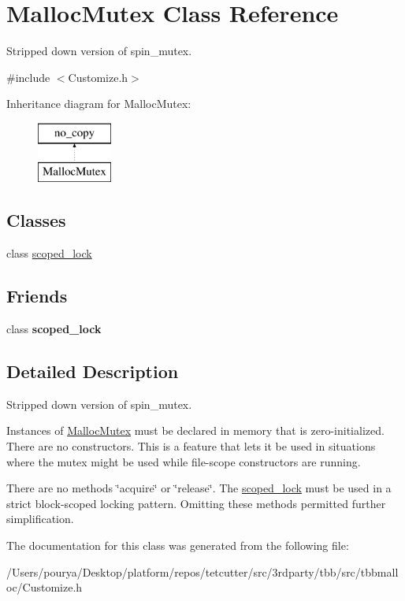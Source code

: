 \hypertarget{classMallocMutex}{}\section{Malloc\+Mutex Class Reference}
\label{classMallocMutex}


Stripped down version of spin\+\_\+mutex.  




{\ttfamily \#include $<$Customize.\+h$>$}

Inheritance diagram for Malloc\+Mutex\+:\begin{figure}[H]
\begin{center}
\leavevmode
\includegraphics[height=2.000000cm]{classMallocMutex}
\end{center}
\end{figure}
\subsection*{Classes}
\begin{DoxyCompactItemize}
\item 
class \hyperlink{classMallocMutex_1_1scoped__lock}{scoped\+\_\+lock}
\end{DoxyCompactItemize}
\subsection*{Friends}
\begin{DoxyCompactItemize}
\item 
\hypertarget{classMallocMutex_afcf922650b2fd9d76b7b939d8511bbd8}{}class {\bfseries scoped\+\_\+lock}\label{classMallocMutex_afcf922650b2fd9d76b7b939d8511bbd8}

\end{DoxyCompactItemize}


\subsection{Detailed Description}
Stripped down version of spin\+\_\+mutex. 

Instances of \hyperlink{classMallocMutex}{Malloc\+Mutex} must be declared in memory that is zero-\/initialized. There are no constructors. This is a feature that lets it be used in situations where the mutex might be used while file-\/scope constructors are running.

There are no methods \char`\"{}acquire\char`\"{} or \char`\"{}release\char`\"{}. The \hyperlink{classMallocMutex_1_1scoped__lock}{scoped\+\_\+lock} must be used in a strict block-\/scoped locking pattern. Omitting these methods permitted further simplification. 

The documentation for this class was generated from the following file\+:\begin{DoxyCompactItemize}
\item 
/\+Users/pourya/\+Desktop/platform/repos/tetcutter/src/3rdparty/tbb/src/tbbmalloc/Customize.\+h\end{DoxyCompactItemize}
